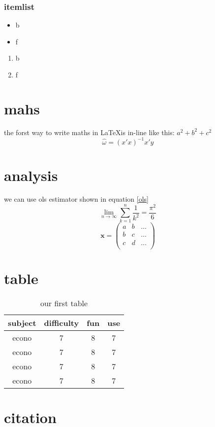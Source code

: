 \documentclass[a4paper, 12pt] {article}
\begin{document}
\subsubsection{itemlist}
\begin{itemize}

\item{b}
{\setlength\itemindent{25pt}}
\item{f}

\end{itemize}
\begin{enumerate}
\item{b}
\item{f}
\end{enumerate}

\section{mahs}
the forst way to write maths in \LaTeX is in-line like this:
$a^2+b^2+c^2$
\begin{equation}\label{ols}
\hat{\omega}=(x'x)^{-1}x'y
\end{equation}
\section{analysis}
we can use ols estimator shown in equation 
\ref{ols}
\begin{equation}
\lim_{n \to \infty}
\sum_{k=1}^n \frac{1}{k^2}
=\frac{\pi^2}{6}
\end{equation}
\begin{equation*}
\mathbf{x} = \left(
\begin{array}{ccc}
a & b & \ldots \\
b & c & \ldots \\
c & d & \ldots \\
\end{array}\right)
\end{equation*}



\section{table}
\begin{center}
\begin{table}[!h]
\caption{our first table}
\vspace{0.15in}
\begin{tabular}{c | c | c | c}
subject & difficulty & fun & use\\ \hline
econo & 7 & 8 & 7\\
econo & 7 & 8 & 7\\
econo & 7 & 8 & 7\\
econo & 7 & 8 & 7\\
\end{tabular}
\end{table}
\end{center}

\section{citation}
\cite{william}


\end{document}
